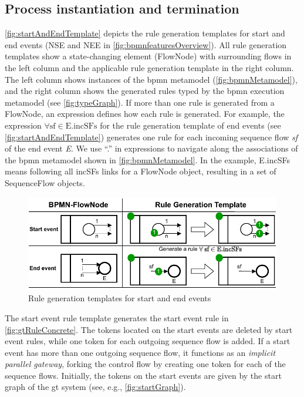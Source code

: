 \documentclass[runningheads]{llncs}
\begin{document}
\subsection{Process instantiation and termination} \label{subsec:instAndTermination}

\autoref{fig:startAndEndTemplate} depicts the rule generation templates for start and end events (\textsf{NSE} and \textsf{NEE} in \autoref{fig:bpmnfeaturesOverview}).
All rule generation templates show a state-changing element (\textsf{FlowNode}) with surrounding flows in the left column and the applicable rule generation template in the right column.
The left column shows instances of the \gls*{bpmn} metamodel (\autoref{fig:bpmnMetamodel}), and the right column shows the generated rules typed by the \gls*{bpmn} execution metamodel (see \autoref{fig:typeGraph}).
If more than one rule is generated from a \textsf{FlowNode}, an expression defines how each rule is generated.
For example, the expression $\forall \text{sf} \in \text{E.incSFs}$ for the rule generation template of end events (see \autoref{fig:startAndEndTemplate}) generates one rule for each incoming sequence flow \textit{sf} of the end event \textit{E}.
We use ``.'' in expressions to navigate along the associations of the \gls*{bpmn} metamodel shown in \autoref{fig:bpmnMetamodel}.
In the example, \textsf{E.incSFs} means following all \textsf{incSFs} links for a \textsf{FlowNode} object, resulting in a set of \textsf{SequenceFlow} objects.



\begin{figure}[ht]
    \centering
    \includegraphics[width=.8\textwidth]{images/start_end_template.pdf}
    \caption{Rule generation templates for start and end events}
    \label{fig:startAndEndTemplate}
\end{figure}

The start event rule template generates the start event rule in \autoref{fig:gtRuleConcrete}.
The tokens located on the start events are deleted by start event rules, while one token for each outgoing sequence flow is added.
If a start event has more than one outgoing sequence flow, it functions as an \textit{implicit parallel gateway}, forking the control flow by creating one token for each of the sequence flows.
Initially, the tokens on the start events are given by the start graph of the \gls*{gt} system (see, e.g., \autoref{fig:startGraph}).
    
\end{document}
